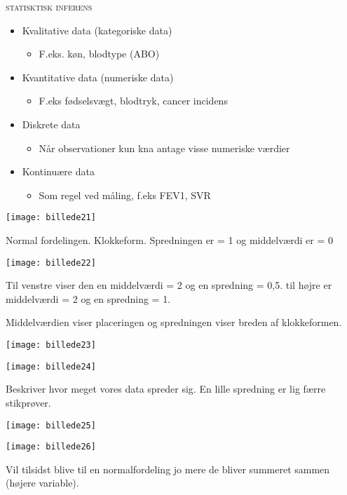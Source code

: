 \documentclass[12pt, letterpaper]{article}
\begin{document}
\textsc{statisktisk inferens}
\begin{itemize}
\item Kvalitative data (kategoriske data)
\begin{itemize}
\item F.eks. køn, blodtype (ABO)
\end{itemize}
\item Kvantitative data (numeriske data)
\begin{itemize}
\item F.eks fødselsvægt, blodtryk, cancer incidens
\end{itemize}
\item Diskrete data
\begin{itemize}
\item Når observationer kun kna antage visse numeriske værdier
\end{itemize}
\item Kontinuære data
\begin{itemize}
\item Som regel ved måling, f.eks FEV1, SVR
\end{itemize}
\end{itemize}

\begin{center}
\texttt{[image: billede21]}
\end{center}
Normal fordelingen. Klokkeform. Spredningen er = 1 og middelværdi er = 0

\begin{center}
\texttt{[image: billede22]}
\end{center}
Til venstre viser den en middelværdi = 2 og en spredning = 0,5. til højre er middelværdi = 2 og en spredning = 1. 

Middelværdien viser placeringen og spredningen viser breden af klokkeformen. 

\begin{center}
\texttt{[image: billede23]}
\end{center}

\begin{center}
\texttt{[image: billede24]}
\end{center}
Beskriver hvor meget vores data spreder sig. En lille spredning er lig færre stikprøver.

\begin{center}
\texttt{[image: billede25]}
\end{center}

\begin{center}
\texttt{[image: billede26]}
\end{center}
Vil tilsidst blive til en normalfordeling jo mere de bliver summeret sammen (højere variable). 
\end{document}
